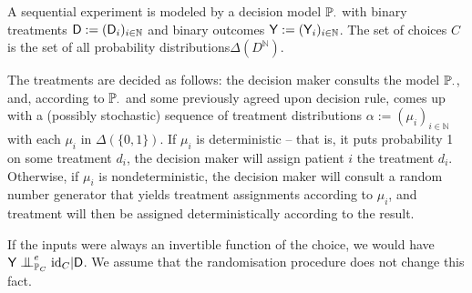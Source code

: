 

\begin{example}\label{ex:randomised_experiment}
A sequential experiment is modeled by a decision model $\mathbb{P}_\cdot$ with binary treatments $\mathsf{D}:=(\mathsf{D}_i)_{i\in \mathbb{N}}$ and binary outcomes $\mathsf{Y}:=(\mathsf{Y}_i)_{i\in\mathbb{N}}$. The set of choices $C$ is the set of all probability distributions$\Delta(D^\mathbb{N})$.

The treatments are decided as follows: the decision maker consults the model $\mathbb{P}_\cdot$, and, according to $\mathbb{P}_\cdot$ and some previously agreed upon decision rule, comes up with a (possibly stochastic) sequence  of treatment distributions $\alpha:=(\mu_i)_{i\in \mathbb{N}}$ with each $\mu_i$ in $\Delta(\{0,1\})$. If $\mu_i$ is deterministic -- that is, it puts probability 1 on some treatment $d_i$, the decision maker will assign patient $i$ the treatment $d_i$. Otherwise, if $\mu_i$ is nondeterministic, the decision maker will consult a random number generator that yields treatment assignments according to $\mu_i$, and treatment will then be assigned deterministically according to the result.

If the inputs were always an invertible function of the choice, we would have $\RV{Y}\CI^e_{\prob{P}_C} \text{id}_C|\RV{D}$. We assume that the randomisation procedure does not change this fact.


\end{example}
